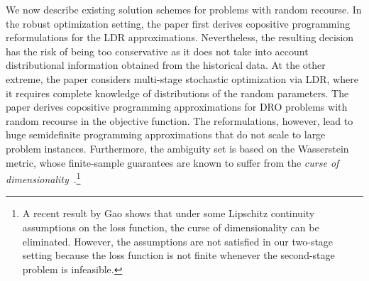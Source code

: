 \documentclass{article}
\begin{document}
We now describe existing solution schemes for problems with random recourse. In the robust optimization setting, the paper \cite{MSRO-decision-rules} first derives copositive programming reformulations for the LDR approximations.  %
Nevertheless, the resulting decision has the risk of being too conservative as it does not take into account distributional information obtained from  the historical data. At the other extreme, the  paper \cite{Random-Recourse-Stochastic} considers multi-stage stochastic optimization via LDR, where it requires complete knowledge of distributions of the random parameters.  The paper \cite{Wass-SDP} derives  copositive programming approximations for DRO problems with random recourse in the objective function. The reformulations, however, lead to huge semidefinite programming approximations that do not scale to large problem instances. Furthermore, the ambiguity set is based on the Wasserstein metric, whose finite-sample guarantees are known to suffer from the \emph{curse of dimensionality}~\cite{esfahani2018data}.\footnote{A recent result by Gao  \cite{gao2020finite} shows that under some Lipschitz continuity assumptions on the loss function, the curse of dimensionality can be eliminated. However, the assumptions are not satisfied in our two-stage setting because the loss function is not finite whenever the second-stage problem is infeasible. } 
\end{document}
